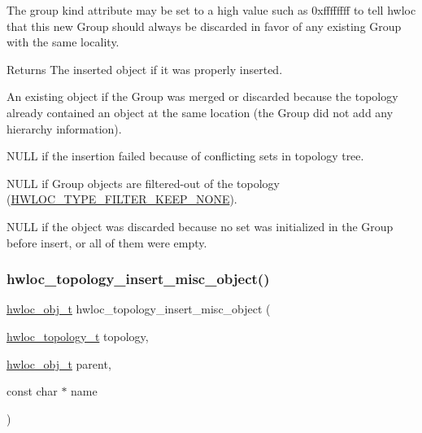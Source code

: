The group {\ttfamily kind} attribute may be set to a high value such as {\ttfamily 0xffffffff} to tell hwloc that this new Group should always be discarded in favor of any existing Group with the same locality.

\begin{DoxyReturn}{Returns}
The inserted object if it was properly inserted.

An existing object if the Group was merged or discarded because the topology already contained an object at the same location (the Group did not add any hierarchy information).

{\ttfamily N\+U\+LL} if the insertion failed because of conflicting sets in topology tree.

{\ttfamily N\+U\+LL} if Group objects are filtered-\/out of the topology (\hyperlink{a00193_gga9a5a1f0140cd1952544477833733195ba4f835955414de92c77d99b8419d4647a}{H\+W\+L\+O\+C\+\_\+\+T\+Y\+P\+E\+\_\+\+F\+I\+L\+T\+E\+R\+\_\+\+K\+E\+E\+P\+\_\+\+N\+O\+NE}).

{\ttfamily N\+U\+LL} if the object was discarded because no set was initialized in the Group before insert, or all of them were empty. 
\end{DoxyReturn}
\mbox{\label{a00194_gad980782ade737900c5cf208946768c30}} 
\subsubsection{\texorpdfstring{hwloc\+\_\+topology\+\_\+insert\+\_\+misc\+\_\+object()}{hwloc\_topology\_insert\_misc\_object()}}
{\footnotesize\ttfamily \hyperlink{a00185_ga79b8ab56877ef99ac59b833203391c7d}{hwloc\+\_\+obj\+\_\+t} hwloc\+\_\+topology\+\_\+insert\+\_\+misc\+\_\+object (\begin{DoxyParamCaption}\item[{\hyperlink{a00186_ga9d1e76ee15a7dee158b786c30b6a6e38}{hwloc\+\_\+topology\+\_\+t}}]{topology,  }\item[{\hyperlink{a00185_ga79b8ab56877ef99ac59b833203391c7d}{hwloc\+\_\+obj\+\_\+t}}]{parent,  }\item[{const char $\ast$}]{name }\end{DoxyParamCaption})}



